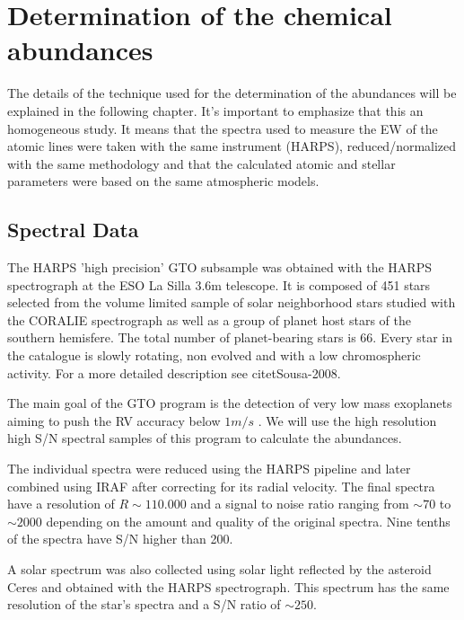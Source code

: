 \documentclass[dvips,12pt,a4paper]{report}
\begin{document}
{\chapter {Determination of the chemical abundances}
\label{chap_3}
The details of the technique used for the determination of the abundances will be explained in the following chapter.  It's important to emphasize that this an homogeneous study. It means that the spectra used to measure the EW of the atomic lines were taken with the same instrument (HARPS), reduced/normalized with the same methodology and that the calculated atomic and stellar parameters were based on the same atmospheric models.

\section {Spectral Data}

The HARPS 'high precision' GTO subsample was obtained with the HARPS spectrograph at the ESO La Silla 3.6m telescope. It is composed of 451 stars selected from the volume limited sample of solar neighborhood stars studied with the CORALIE spectrograph \citep{Udry-2000} as well as a group of planet host stars of the southern hemisfere. The total number of planet-bearing stars is 66. Every star in the catalogue is slowly rotating, non evolved and with a low chromospheric activity. For a more detailed description see citet{Sousa-2008}.

The main goal of the GTO program is the detection of very low mass exoplanets aiming to push the RV accuracy below $1m/s$ \citep{Mayor-2003b}. We will use the high resolution high S/N spectral samples of this program to calculate the abundances. 

The individual spectra were reduced using the HARPS pipeline and later combined using IRAF after correcting for its radial velocity. The final spectra have a resolution of $R\sim110.000$ and a signal to noise ratio ranging from $\sim70$ to $\sim2000$ depending on the amount and quality of the original spectra. Nine tenths of the spectra have S/N higher than 200.  


A solar spectrum was also collected using solar light reflected by the asteroid Ceres and obtained with the HARPS spectrograph. This spectrum has the same resolution of the star's spectra and a S/N ratio of $\sim250$. 

}
\end{document}
